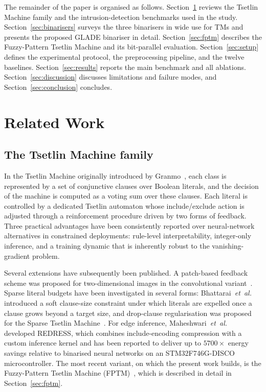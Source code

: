 \documentclass[journal,10pt]{IEEEtran}
\begin{document}
The remainder of the paper is organised as follows.
Section~\ref{sec:related} reviews the Tsetlin Machine family and the
intrusion-detection benchmarks used in the study.
Section~\ref{sec:binarisers} surveys the three binarisers in wide use
for TMs and presents the proposed GLADE binariser in detail.
Section~\ref{sec:fptm} describes the Fuzzy-Pattern Tsetlin Machine and
its bit-parallel evaluation. Section~\ref{sec:setup} defines the
experimental protocol, the preprocessing pipeline, and the twelve
baselines. Section~\ref{sec:results} reports the main benchmark and
all ablations. Section~\ref{sec:discussion} discusses limitations and
failure modes, and Section~\ref{sec:conclusion} concludes.

\section{Related Work}
\label{sec:related}

\subsection{The Tsetlin Machine family}
In the Tsetlin Machine originally introduced by
Granmo~\cite{granmo2018tsetlin}, each class is represented by a set of
conjunctive clauses over Boolean literals, and the decision of the
machine is computed as a voting sum over these clauses. Each literal
is controlled by a dedicated Tsetlin automaton whose include/exclude
action is adjusted through a reinforcement procedure driven by two
forms of feedback. Three practical advantages have been consistently
reported over neural-network alternatives in constrained deployments:
rule-level interpretability, integer-only inference, and a training
dynamic that is inherently robust to the vanishing-gradient problem.

Several extensions have subsequently been published. A patch-based
feedback scheme was proposed for two-dimensional images in the
convolutional variant~\cite{granmo2019convolutional}. Sparse literal
budgets have been investigated in several forms:
Bhattarai~\emph{et~al.}~\cite{bhattarai2023concise} introduced a soft
clause-size constraint under which literals are expelled once a clause
grows beyond a target size, and drop-clause regularisation was
proposed for the Sparse Tsetlin
Machine~\cite{sharma2023drop}. For edge inference,
Maheshwari~\emph{et~al.}~\cite{maheshwari2023redress} developed
REDRESS, which combines include-encoding compression with a custom
inference kernel and has been reported to deliver up to $5700\times$
energy savings relative to binarised neural networks on an
STM32F746G-DISCO microcontroller. The most recent variant, on which
the present work builds, is the Fuzzy-Pattern Tsetlin Machine
(FPTM)~\cite{hnilov2025fuzzy}, which is described in detail in
Section~\ref{sec:fptm}.
\end{document}
